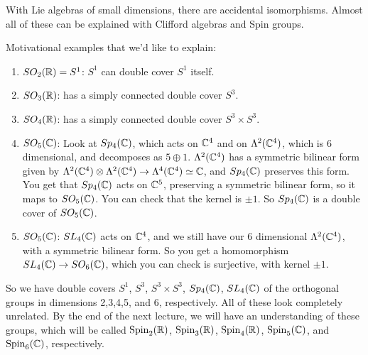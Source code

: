  \setcounter{lecture}{22}

 With Lie algebras of small dimensions, there are accidental isomorphisms. Almost all
 of these can be explained with Clifford algebras and Spin groups.

 Motivational examples that we'd like to explain:
 \begin{enumerate}
   \item $SO_2(\mathbb{R}) = S^1$: $S^1$ can double cover $S^1$ itself.
   \item $SO_3(\mathbb{R})$: has a simply connected double cover $S^3$.
   \item $SO_4(\mathbb{R})$: has a simply connected double cover $S^3\times S^3$.

   \item $SO_5(\mathbb{C})$: Look at $Sp_4(\mathbb{C})$, which acts on $\mathbb{C}^4$ and on
   $\Lambda^2(\mathbb{C}^4)$, which is 6 dimensional, and decomposes as $5\oplus 1$.
   $\Lambda^2(\mathbb{C}^4)$ has a symmetric bilinear form given by $\Lambda^2(\mathbb{C}^4)\otimes
   \Lambda^2(\mathbb{C}^4)\to \Lambda^4(\mathbb{C}^4)\simeq \mathbb{C}$, and $Sp_4(\mathbb{C})$ preserves this form.
    You get that $Sp_4(\mathbb{C})$ acts on
   $\mathbb{C}^5$, preserving a symmetric bilinear form, so it maps to $SO_5(\mathbb{C})$. You can
   check that the kernel is $\pm 1$. So $Sp_4(\mathbb{C})$ is a double cover of $SO_5(\mathbb{C})$.

   \item $SO_5(\mathbb{C})$: $SL_4(\mathbb{C})$ acts on $\mathbb{C}^4$, and we still have our 6 dimensional
   $\Lambda^2(\mathbb{C}^4)$, with a symmetric bilinear form. So you get a homomorphism
   $SL_4(\mathbb{C}) \to SO_6(\mathbb{C})$, which you can check is surjective, with kernel $\pm 1$.
 \end{enumerate}
 So we have double covers $S^1$, $S^3$, $S^3\times S^3$, $Sp_4(\mathbb{C})$, $SL_4(\mathbb{C})$ of
 the orthogonal groups in dimensions 2,3,4,5, and 6, respectively. All of these look
 completely unrelated. By the end of the next lecture, we will have an understanding
 of these groups, which will be called $\operatorname{Spin}_2(\mathbb{R})$, $\operatorname{Spin}_3(\mathbb{R})$, $\operatorname{Spin}_4(\mathbb{R})$,
 $\operatorname{Spin}_5(\mathbb{C})$, and $\operatorname{Spin}_6(\mathbb{C})$, respectively.

